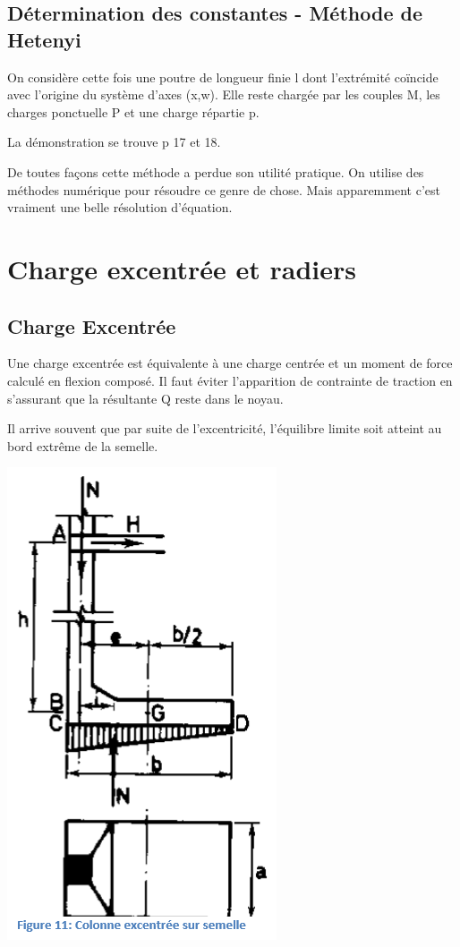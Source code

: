 \subsection{Détermination des constantes - Méthode de Hetenyi}

On considère cette fois une poutre de longueur finie l dont l'extrémité coïncide avec l'origine du système d'axes (x,w). Elle reste chargée par les couples M, les charges ponctuelle P et une charge répartie p.

La démonstration se trouve p 17 et 18.

De toutes façons cette méthode a perdue son utilité pratique. On utilise des méthodes numérique pour résoudre ce genre de chose. Mais apparemment c'est vraiment une belle résolution d'équation.

\section{Charge excentrée et radiers}

\subsection{Charge Excentrée}

Une charge excentrée est équivalente à une charge centrée et un moment de force calculé en flexion composé. Il faut éviter l'apparition de contrainte de traction en s'assurant que la résultante Q reste dans le noyau.

Il arrive souvent que par suite de l'excentricité, l'équilibre limite soit atteint au bord extrême de la semelle.

\begin{center}
\includegraphics [scale=0.5]{pictures/11.PNG}
\end{center}

